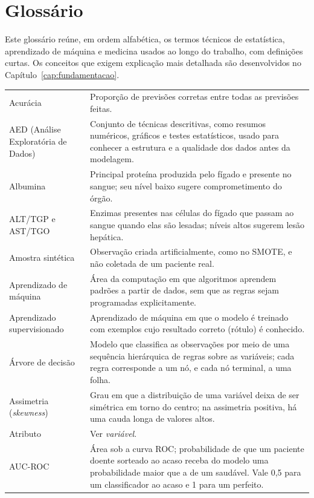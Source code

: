 \chapter*{Glossário}
\label{glossario}

Este glossário reúne, em ordem alfabética, os termos técnicos de estatística, aprendizado de máquina e medicina usados ao longo do trabalho, com definições curtas. Os conceitos que exigem explicação mais detalhada são desenvolvidos no Capítulo~\ref{cap:fundamentacao}.

\begin{longtable}{@{}p{3.8cm}p{10.7cm}@{}}
Acurácia & Proporção de previsões corretas entre todas as previsões feitas. \\[0.15cm]
AED (Análise Exploratória de Dados) & Conjunto de técnicas descritivas, como resumos numéricos, gráficos e testes estatísticos, usado para conhecer a estrutura e a qualidade dos dados antes da modelagem. \\[0.15cm]
Albumina & Principal proteína produzida pelo fígado e presente no sangue; seu nível baixo sugere comprometimento do órgão. \\[0.15cm]
ALT/TGP e AST/TGO & Enzimas presentes nas células do fígado que passam ao sangue quando elas são lesadas; níveis altos sugerem lesão hepática. \\[0.15cm]
Amostra sintética & Observação criada artificialmente, como no SMOTE, e não coletada de um paciente real. \\[0.15cm]
Aprendizado de máquina & Área da computação em que algoritmos aprendem padrões a partir de dados, sem que as regras sejam programadas explicitamente. \\[0.15cm]
Aprendizado supervisionado & Aprendizado de máquina em que o modelo é treinado com exemplos cujo resultado correto (rótulo) é conhecido. \\[0.15cm]
Árvore de decisão & Modelo que classifica as observações por meio de uma sequência hierárquica de regras sobre as variáveis; cada regra corresponde a um nó, e cada nó terminal, a uma folha. \\[0.15cm]
Assimetria (\textit{skewness}) & Grau em que a distribuição de uma variável deixa de ser simétrica em torno do centro; na assimetria positiva, há uma cauda longa de valores altos. \\[0.15cm]
Atributo & Ver \textit{variável}. \\[0.15cm]
AUC-ROC & Área sob a curva ROC; probabilidade de que um paciente doente sorteado ao acaso receba do modelo uma probabilidade maior que a de um saudável. Vale 0,5 para um classificador ao acaso e 1 para um perfeito. \\[0.15cm]

\end{longtable}
